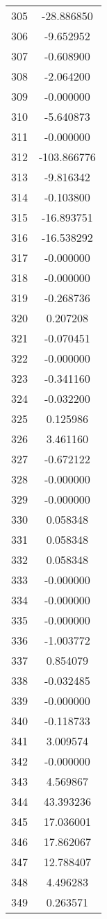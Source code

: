 \documentclass[12pt]{article}
\begin{document}
\begin{longtable}{@{}cc@{}}
305 & -28.886850 \\
306 & -9.652952 \\
307 & -0.608900 \\
308 & -2.064200 \\
309 & -0.000000 \\
310 & -5.640873 \\
311 & -0.000000 \\
312 & -103.866776 \\
313 & -9.816342 \\
314 & -0.103800 \\
315 & -16.893751 \\
316 & -16.538292 \\
317 & -0.000000 \\
318 & -0.000000 \\
319 & -0.268736 \\
320 & 0.207208 \\
321 & -0.070451 \\
322 & -0.000000 \\
323 & -0.341160 \\
324 & -0.032200 \\
325 & 0.125986 \\
326 & 3.461160 \\
327 & -0.672122 \\
328 & -0.000000 \\
329 & -0.000000 \\
330 & 0.058348 \\
331 & 0.058348 \\
332 & 0.058348 \\
333 & -0.000000 \\
334 & -0.000000 \\
335 & -0.000000 \\
336 & -1.003772 \\
337 & 0.854079 \\
338 & -0.032485 \\
339 & -0.000000 \\
340 & -0.118733 \\
341 & 3.009574 \\
342 & -0.000000 \\
343 & 4.569867 \\
344 & 43.393236 \\
345 & 17.036001 \\
346 & 17.862067 \\
347 & 12.788407 \\
348 & 4.496283 \\
349 & 0.263571 \\

\end{longtable}
\end{document}
